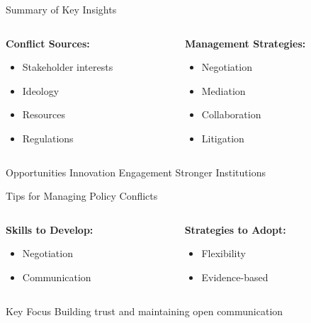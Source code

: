 \documentclass[10pt]{beamer}
\begin{document}
\begin{frame}{Summary of Key Insights}
    \begin{columns}[T]
        \begin{column}{0.5\textwidth}
            \textbf{Conflict Sources:}
            \begin{itemize}
                \item Stakeholder interests
                \item Ideology
                \item Resources
                \item Regulations
            \end{itemize}
        \end{column}
        \begin{column}{0.5\textwidth}
            \textbf{Management Strategies:}
            \begin{itemize}
                \item Negotiation
                \item Mediation
                \item Collaboration
                \item Litigation
            \end{itemize}
        \end{column}
    \end{columns}
    
    \begin{alertblock}{Opportunities}
        Innovation  \quad
        Engagement  \quad
        Stronger Institutions 
    \end{alertblock}
\end{frame}

\begin{frame}{Tips for Managing Policy Conflicts}
    \begin{columns}[T]
        \begin{column}{0.5\textwidth}
            \textbf{Skills to Develop:}
            \begin{itemize}
                \item Negotiation 
                \item Communication 
            \end{itemize}
        \end{column}
        \begin{column}{0.5\textwidth}
            \textbf{Strategies to Adopt:}
            \begin{itemize}
                \item Flexibility 
                \item Evidence-based 
            \end{itemize}
        \end{column}
    \end{columns}
    
    \begin{exampleblock}{Key Focus}
        Building trust and maintaining open communication
    \end{exampleblock}
\end{frame}
\end{document}
